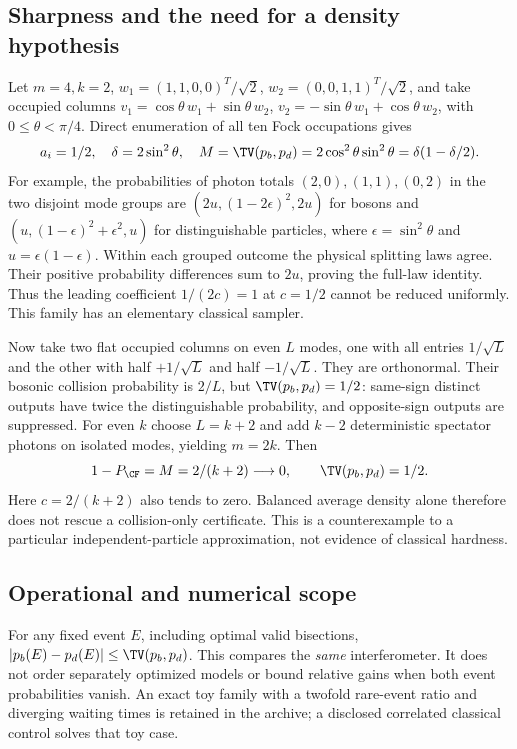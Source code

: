 \subsection{Sharpness and the need for a density hypothesis}
Let $m=4,k=2$, $w_1=(1,1,0,0)^T/\sqrt2$, $w_2=(0,0,1,1)^T/\sqrt2$, and take occupied columns $v_1=\cos\theta\,w_1+\sin\theta\,w_2$, $v_2=-\sin\theta\,w_1+\cos\theta\,w_2$, with $0\le\theta<\pi/4$. Direct enumeration of all ten Fock occupations gives
\begin{equation}
 a_i=1/2,\quad\delta=2\sin^2\theta,\quad
 M=\TV(p_b,p_d)=2\cos^2\theta\sin^2\theta
 =\delta(1-\delta/2).\label{eq:sharp}
\end{equation}
For example, the probabilities of photon totals $(2,0),(1,1),(0,2)$ in the two disjoint mode groups are $(2u,(1-2\epsilon)^2,2u)$ for bosons and $(u,(1-\epsilon)^2+\epsilon^2,u)$ for distinguishable particles, where $\epsilon=\sin^2\theta$ and $u=\epsilon(1-\epsilon)$. Within each grouped outcome the physical splitting laws agree. Their positive probability differences sum to $2u$, proving the full-law identity. Thus the leading coefficient $1/(2c)=1$ at $c=1/2$ cannot be reduced uniformly. This family has an elementary classical sampler.

Now take two flat occupied columns on even $L$ modes, one with all entries $1/\sqrt L$ and the other with half $+1/\sqrt L$ and half $-1/\sqrt L$. They are orthonormal. Their bosonic collision probability is $2/L$, but $\TV(p_b,p_d)=1/2$: same-sign distinct outputs have twice the distinguishable probability, and opposite-sign outputs are suppressed. For even $k$ choose $L=k+2$ and add $k-2$ deterministic spectator photons on isolated modes, yielding $m=2k$. Then
\begin{equation}
 1-P_{\CF}=M=2/(k+2)\longrightarrow0,\qquad
 \TV(p_b,p_d)=1/2.\label{eq:spectator}
\end{equation}
Here $c=2/(k+2)$ also tends to zero. Balanced average density alone therefore does not rescue a collision-only certificate. This is a counterexample to a particular independent-particle approximation, not evidence of classical hardness.

\subsection{Operational and numerical scope}
For any fixed event $E$, including optimal valid bisections, $|p_b(E)-p_d(E)|\le\TV(p_b,p_d)$. This compares the \emph{same} interferometer. It does not order separately optimized models or bound relative gains when both event probabilities vanish. An exact toy family with a twofold rare-event ratio and diverging waiting times is retained in the archive; a disclosed correlated classical control solves that toy case.

